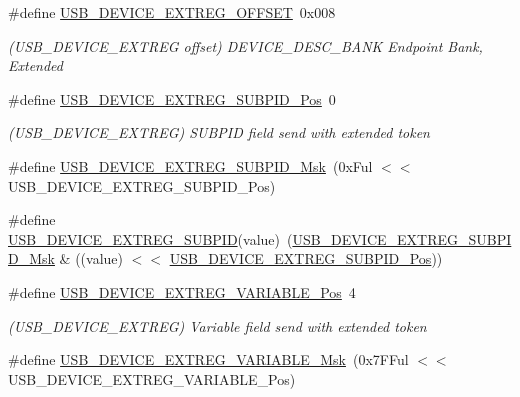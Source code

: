 \begin{DoxyCompactItemize}
\#define \mbox{\hyperlink{group___s_a_m_d21___u_s_b_ga9ba63c398bf06c6ba1d750e53db76505}{U\+S\+B\+\_\+\+D\+E\+V\+I\+C\+E\+\_\+\+E\+X\+T\+R\+E\+G\+\_\+\+O\+F\+F\+S\+ET}}~0x008
\begin{DoxyCompactList}\small\item\em (U\+S\+B\+\_\+\+D\+E\+V\+I\+C\+E\+\_\+\+E\+X\+T\+R\+EG offset) D\+E\+V\+I\+C\+E\+\_\+\+D\+E\+S\+C\+\_\+\+B\+A\+NK Endpoint Bank, Extended \end{DoxyCompactList}\item 
\#define \mbox{\hyperlink{group___s_a_m_d21___u_s_b_gaaee8dcd3a757e47151ddd4d36545a469}{U\+S\+B\+\_\+\+D\+E\+V\+I\+C\+E\+\_\+\+E\+X\+T\+R\+E\+G\+\_\+\+S\+U\+B\+P\+I\+D\+\_\+\+Pos}}~0
\begin{DoxyCompactList}\small\item\em (U\+S\+B\+\_\+\+D\+E\+V\+I\+C\+E\+\_\+\+E\+X\+T\+R\+EG) S\+U\+B\+P\+ID field send with extended token \end{DoxyCompactList}\item 
\#define \mbox{\hyperlink{group___s_a_m_d21___u_s_b_ga1ac40b811a7e3396bf75111ac3c651fd}{U\+S\+B\+\_\+\+D\+E\+V\+I\+C\+E\+\_\+\+E\+X\+T\+R\+E\+G\+\_\+\+S\+U\+B\+P\+I\+D\+\_\+\+Msk}}~(0x\+Ful $<$$<$ U\+S\+B\+\_\+\+D\+E\+V\+I\+C\+E\+\_\+\+E\+X\+T\+R\+E\+G\+\_\+\+S\+U\+B\+P\+I\+D\+\_\+\+Pos)
\item 
\#define \mbox{\hyperlink{group___s_a_m_d21___u_s_b_ga8c9b03460ec45ab4350f5af0a7ea1b1f}{U\+S\+B\+\_\+\+D\+E\+V\+I\+C\+E\+\_\+\+E\+X\+T\+R\+E\+G\+\_\+\+S\+U\+B\+P\+ID}}(value)~(\mbox{\hyperlink{group___s_a_m_d21___u_s_b_ga1ac40b811a7e3396bf75111ac3c651fd}{U\+S\+B\+\_\+\+D\+E\+V\+I\+C\+E\+\_\+\+E\+X\+T\+R\+E\+G\+\_\+\+S\+U\+B\+P\+I\+D\+\_\+\+Msk}} \& ((value) $<$$<$ \mbox{\hyperlink{group___s_a_m_d21___u_s_b_gaaee8dcd3a757e47151ddd4d36545a469}{U\+S\+B\+\_\+\+D\+E\+V\+I\+C\+E\+\_\+\+E\+X\+T\+R\+E\+G\+\_\+\+S\+U\+B\+P\+I\+D\+\_\+\+Pos}}))
\item 
\#define \mbox{\hyperlink{group___s_a_m_d21___u_s_b_gaf9a6b648d84872b8c9b566ce0e778a96}{U\+S\+B\+\_\+\+D\+E\+V\+I\+C\+E\+\_\+\+E\+X\+T\+R\+E\+G\+\_\+\+V\+A\+R\+I\+A\+B\+L\+E\+\_\+\+Pos}}~4
\begin{DoxyCompactList}\small\item\em (U\+S\+B\+\_\+\+D\+E\+V\+I\+C\+E\+\_\+\+E\+X\+T\+R\+EG) Variable field send with extended token \end{DoxyCompactList}\item 
\#define \mbox{\hyperlink{group___s_a_m_d21___u_s_b_ga1ad3c27f4944051059ace965df14dd87}{U\+S\+B\+\_\+\+D\+E\+V\+I\+C\+E\+\_\+\+E\+X\+T\+R\+E\+G\+\_\+\+V\+A\+R\+I\+A\+B\+L\+E\+\_\+\+Msk}}~(0x7\+F\+Ful $<$$<$ U\+S\+B\+\_\+\+D\+E\+V\+I\+C\+E\+\_\+\+E\+X\+T\+R\+E\+G\+\_\+\+V\+A\+R\+I\+A\+B\+L\+E\+\_\+\+Pos)
$$
\end{DoxyCompactItemize}
